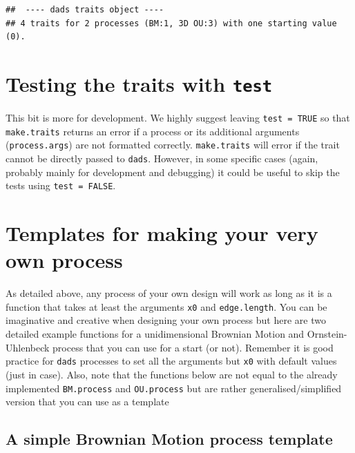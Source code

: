 \documentclass[]{book}
\begin{document}
\begin{verbatim}
##  ---- dads traits object ---- 
## 4 traits for 2 processes (BM:1, 3D OU:3) with one starting value (0).
\end{verbatim}

\hypertarget{testing-the-traits-with-test}{%
\section{\texorpdfstring{Testing the traits with \texttt{test}}{Testing the traits with test}}\label{testing-the-traits-with-test}}

This bit is more for development.
We highly suggest leaving \texttt{test\ =\ TRUE} so that \texttt{make.traits} returns an error if a process or its additional arguments (\texttt{process.args}) are not formatted correctly.
\texttt{make.traits} will error if the trait cannot be directly passed to \texttt{dads}.
However, in some specific cases (again, probably mainly for development and debugging) it could be useful to skip the tests using \texttt{test\ =\ FALSE}.

\hypertarget{templates-for-making-your-very-own-process}{%
\section{Templates for making your very own process}\label{templates-for-making-your-very-own-process}}

As detailed above, any process of your own design will work as long as it is a function that takes at least the arguments \texttt{x0} and \texttt{edge.length}.
You can be imaginative and creative when designing your own process but here are two detailed example functions for a unidimensional Brownian Motion and Ornstein-Uhlenbeck process that you can use for a start (or not).
Remember it is good practice for \texttt{dads} processes to set all the arguments but \texttt{x0} with default values (just in case).
Also, note that the functions below are not equal to the already implemented \texttt{BM.process} and \texttt{OU.process} but are rather generalised/simplified version that you can use as a template

\hypertarget{a-simple-brownian-motion-process-template}{%
\subsection{A simple Brownian Motion process template}\label{a-simple-brownian-motion-process-template}}
\end{document}

